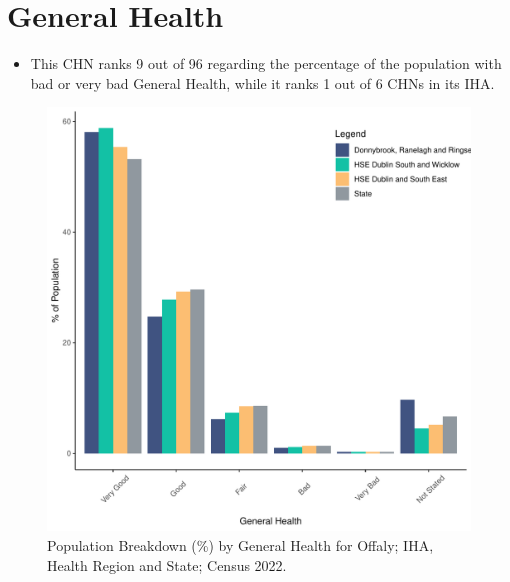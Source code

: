\documentclass{article}
\begin{document}
\pagebreak

\section{General Health}\label{sect:GenHealth}
\begin{itemize}
\item  This CHN ranks  9 out of 96 regarding the percentage of the population with bad or very bad General Health, while it ranks   1 out of 6 CHNs in its IHA.
\end{itemize}
\begin{figure}[h]
	\centering
	\includegraphics[width = 150mm]{../figures/GenED.pdf}
	\caption{Population Breakdown (\%) by General Health for Offaly; IHA, Health Region and State;  Census 2022.}
	\label{fig:2ae19629-1a6a-13a3-e055-000000000001}
	\end{figure}
\end{document}
